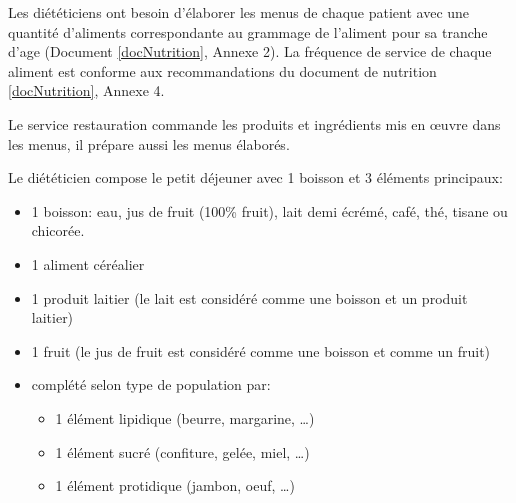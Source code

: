 Les diététiciens ont besoin d'élaborer les menus de chaque patient avec une quantité d'aliments correspondante au grammage de l'aliment pour sa tranche d'age (Document \ref{docNutrition}, Annexe 2). La fréquence de service de chaque aliment est conforme aux recommandations du document de nutrition \ref{docNutrition}, Annexe 4.

Le service restauration commande les produits et ingrédients mis en œuvre dans les menus, il prépare aussi les menus élaborés.

Le diététicien compose le petit déjeuner avec 1 boisson et 3 éléments principaux:
\begin{itemize}
 \item 1 boisson: eau, jus de fruit (100\% fruit), lait demi écrémé, café, thé, tisane ou chicorée. 
 \item 1 aliment céréalier
 \item 1 produit laitier (le lait est considéré comme une boisson et un produit laitier)
 \item 1 fruit (le jus de fruit est considéré comme une boisson et comme un fruit)
 \item complété selon type de population par:
 \begin{itemize}
  \item 1 élément lipidique (beurre, margarine, …)
  \item 1 élément sucré (confiture, gelée, miel, …)
  \item 1 élément protidique (jambon, oeuf, …)
 \end{itemize}
\end{itemize}

